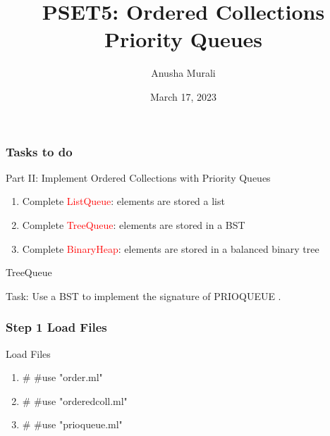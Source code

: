 \documentclass{beamer}
\title{PSET5: Ordered Collections \\ Priority Queues}
\date{March 17, 2023}
\author{Anusha Murali}
\begin{document}

\begin{frame}[fragile]
\titlepage

\end{frame}


\begin{frame}[fragile]
\frametitle{Tasks to do}

\begin{block}{Part II: Implement Ordered Collections with Priority Queues}
\begin{enumerate}
\item Complete \textcolor{red}{ListQueue}: elements are stored a list
\item Complete \textcolor{red}{TreeQueue}: elements are stored in a BST
\item Complete \textcolor{red}{BinaryHeap}: elements are stored in a balanced binary tree
\end{enumerate}
\end{block}
\end{frame}


\begin{frame}[fragile]

\vspace*{0.5in}

\centerline{\huge TreeQueue}

\vspace*{0.2in}
\begin{center}
Task: Use a BST to implement the signature of PRIOQUEUE .
\end{center}

\end{frame}





\begin{frame}[fragile]
\frametitle{Step 1 Load Files}

\begin{block}{Load Files}
\begin{enumerate}
\item \# \#use "order.ml"
\item \# \#use "orderedcoll.ml"
\item \# \#use "prioqueue.ml"
\end{enumerate}
\end{block}
\end{frame}
\end{document}
